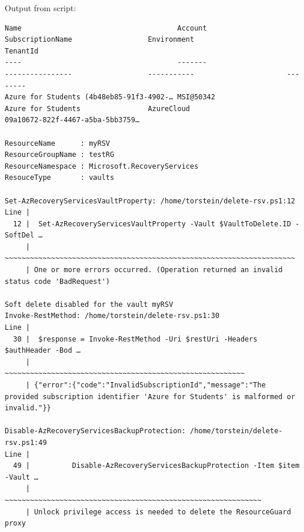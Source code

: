 Output from script:
\begin{verbatim}
Name                                     Account                           SubscriptionName                  Environment                      TenantId
----                                     -------                           ----------------                  -----------                      --------
Azure for Students (4b48eb85-91f3-4902-… MSI@50342                         Azure for Students                AzureCloud                       09a10672-822f-4467-a5ba-5bb3759…

ResourceName      : myRSV
ResourceGroupName : testRG
ResourceNamespace : Microsoft.RecoveryServices
ResouceType       : vaults

Set-AzRecoveryServicesVaultProperty: /home/torstein/delete-rsv.ps1:12
Line |
  12 |  Set-AzRecoveryServicesVaultProperty -Vault $VaultToDelete.ID -SoftDel …
     |  ~~~~~~~~~~~~~~~~~~~~~~~~~~~~~~~~~~~~~~~~~~~~~~~~~~~~~~~~~~~~~~~~~~~~~
     | One or more errors occurred. (Operation returned an invalid status code 'BadRequest')

Soft delete disabled for the vault myRSV
Invoke-RestMethod: /home/torstein/delete-rsv.ps1:30
Line |
  30 |  $response = Invoke-RestMethod -Uri $restUri -Headers $authHeader -Bod …
     |              ~~~~~~~~~~~~~~~~~~~~~~~~~~~~~~~~~~~~~~~~~~~~~~~~~~~~~~~~~
     | {"error":{"code":"InvalidSubscriptionId","message":"The provided subscription identifier 'Azure for Students' is malformed or invalid."}}

Disable-AzRecoveryServicesBackupProtection: /home/torstein/delete-rsv.ps1:49
Line |
  49 |          Disable-AzRecoveryServicesBackupProtection -Item $item -Vault …
     |          ~~~~~~~~~~~~~~~~~~~~~~~~~~~~~~~~~~~~~~~~~~~~~~~~~~~~~~~~~~~~~
     | Unlock privilege access is needed to delete the ResourceGuard proxy


\end{verbatim}
